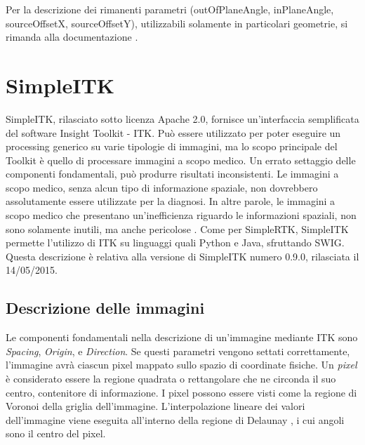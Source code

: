 \documentclass[a4paper,12pt, doubleside]{report}
\begin{document}
                    Per la descrizione dei rimanenti parametri (outOfPlaneAngle, inPlaneAngle, sourceOffsetX, sourceOffsetY), utilizzabili solamente in particolari geometrie, si rimanda alla documentazione \cite{rtk-geometry}.
                
        \section{SimpleITK}
            \par
                SimpleITK, rilasciato sotto licenza Apache 2.0, fornisce un'interfaccia semplificata del software Insight Toolkit - ITK. Può essere utilizzato per poter eseguire un processing generico su varie tipologie di immagini, ma lo scopo principale del Toolkit è quello di processare immagini a scopo medico. Un errato settaggio delle componenti fondamentali, può produrre risultati inconsistenti. Le immagini a scopo medico, senza alcun tipo di informazione spaziale, non dovrebbero assolutamente essere utilizzate per la diagnosi. In altre parole, le immagini a scopo medico che presentano un'inefficienza riguardo le informazioni spaziali, non sono solamente inutili, ma anche pericolose \cite{itk-doc}. Come per SimpleRTK, SimpleITK permette l'utilizzo di ITK su linguaggi quali Python e Java, sfruttando SWIG. Questa descrizione è relativa alla versione di SimpleITK numero 0.9.0, rilasciata il 14/05/2015.
                
            \subsection{Descrizione delle immagini}
            \label{sec:descrizione-immagini}
                Le componenti fondamentali nella descrizione di un'immagine mediante ITK sono \textit{Spacing}, \textit{Origin}, e \textit{Direction}. Se questi parametri vengono settati correttamente, l'immagine avrà ciascun pixel mappato sullo spazio di coordinate fisiche. Un \textit{pixel} è considerato essere la regione quadrata o rettangolare che ne circonda il suo centro, contenitore di informazione. I pixel possono essere visti come la regione di Voronoi \cite{voronoi} della griglia dell’immagine. L’interpolazione lineare dei valori dell’immagine viene eseguita all’interno della regione di Delaunay \cite{delaunay}, i cui angoli sono il centro del pixel. 
                
\end{document}
